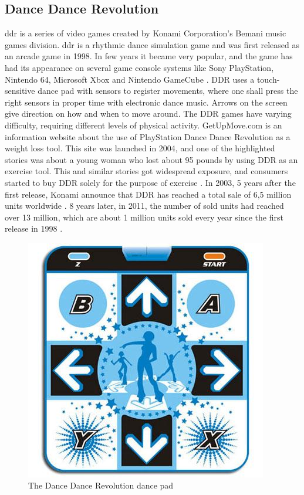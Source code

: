 \subsection{Dance Dance Revolution}
\ac{ddr} is a series of video games created by Konami Corporation’s Bemani music games division. \ac{ddr} is a rhythmic dance simulation game and was first released as an arcade game in 1998. In few years it became very popular, and the game has had its appearance on several game console systems like Sony PlayStation, Nintendo 64, Microsoft Xbox and Nintendo GameCube \cite{bogost2005rhetoric}. DDR uses a touch-sensitive dance pad with sensors to register movements, where one shall press the right sensors in proper time with electronic dance music. Arrows on the screen give direction on how and when to move around. The DDR games have varying difficulty, requiring different levels of physical activity. GetUpMove.com is an information website about the use of PlayStation Dance Dance Revolution as a weight loss tool. This site was launched in 2004, and one of the highlighted stories was about a young woman who lost about 95 pounds by using DDR as an exercise tool. This and similar stories got widespread exposure, and consumers started to buy DDR solely for the purpose of exercise \cite{bogost2005rhetoric}. In 2003, 5 years after the first release, Konami announce that DDR has reached a total sale of 6,5 million units worldwide \cite{gamespot}. 8 years later, in 2011, the number of sold units had reached over 13 million, which are about 1 million units sold every year since the first release in 1998 \cite{gaygamer}. 
\begin{figure}[h!]
\begin{center}
\includegraphics[scale=0.5]{ddrpad}
\caption[Dance Dance Revolution]{The Dance Dance Revolution dance pad}
\label{fig:DDRPad}
\end{center}
\end{figure}

